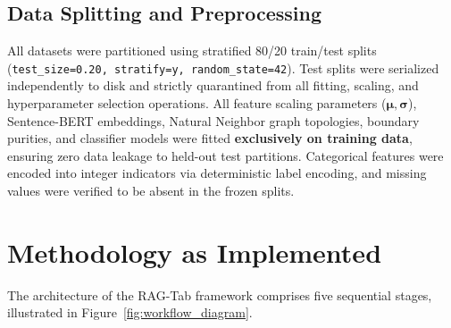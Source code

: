 \documentclass[sn-basic]{sn-jnl}
\begin{document}
\subsection{Data Splitting and Preprocessing}
All datasets were partitioned using stratified 80/20 train/test splits (\texttt{test\_size=0.20, stratify=y, random\_state=42}). Test splits were serialized independently to disk and strictly quarantined from all fitting, scaling, and hyperparameter selection operations. All feature scaling parameters ($\boldsymbol{\mu}, \boldsymbol{\sigma}$), Sentence-BERT embeddings, Natural Neighbor graph topologies, boundary purities, and classifier models were fitted \textbf{exclusively on training data}, ensuring zero data leakage to held-out test partitions. Categorical features were encoded into integer indicators via deterministic label encoding, and missing values were verified to be absent in the frozen splits.

\section{Methodology as Implemented}
\label{sec:methodology}

The architecture of the RAG-Tab framework comprises five sequential stages, illustrated in Figure~\ref{fig:workflow_diagram}.
\end{document}
